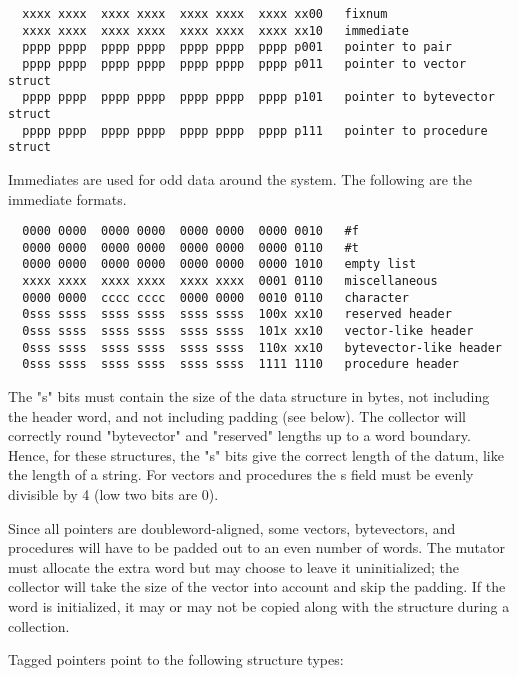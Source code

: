 \begin{minipage}{\linewidth}
\begin{verbatim}
  xxxx xxxx  xxxx xxxx  xxxx xxxx  xxxx xx00   fixnum
  xxxx xxxx  xxxx xxxx  xxxx xxxx  xxxx xx10   immediate
  pppp pppp  pppp pppp  pppp pppp  pppp p001   pointer to pair 
  pppp pppp  pppp pppp  pppp pppp  pppp p011   pointer to vector struct
  pppp pppp  pppp pppp  pppp pppp  pppp p101   pointer to bytevector struct
  pppp pppp  pppp pppp  pppp pppp  pppp p111   pointer to procedure struct
\end{verbatim}
\end{minipage}

Immediates are used for odd data around the system. The following are
the immediate formats.

\begin{minipage}{\linewidth}
\begin{verbatim}
  0000 0000  0000 0000  0000 0000  0000 0010   #f
  0000 0000  0000 0000  0000 0000  0000 0110   #t
  0000 0000  0000 0000  0000 0000  0000 1010   empty list
  xxxx xxxx  xxxx xxxx  xxxx xxxx  0001 0110   miscellaneous
  0000 0000  cccc cccc  0000 0000  0010 0110   character
  0sss ssss  ssss ssss  ssss ssss  100x xx10   reserved header
  0sss ssss  ssss ssss  ssss ssss  101x xx10   vector-like header
  0sss ssss  ssss ssss  ssss ssss  110x xx10   bytevector-like header
  0sss ssss  ssss ssss  ssss ssss  1111 1110   procedure header
\end{verbatim}
\end{minipage}

The "s" bits must contain the size of the data structure in bytes, not
including the header word, and not including padding (see below). The
collector will correctly round "bytevector" and "reserved" lengths up
to a word boundary. Hence, for these structures, the "s" bits give the
correct length of the datum, like the length of a string. For vectors
and procedures the s field must be evenly divisible by 4 (low two bits
are 0).

Since all pointers are doubleword-aligned, some vectors, bytevectors,
and procedures will have to be padded out to an even number of words.
The mutator must allocate the extra word but may choose to leave it
uninitialized; the collector will take the size of the vector into
account and skip the padding. If the word is initialized, it may or
may not be copied along with the structure during a collection.

Tagged pointers point to the following structure types:

